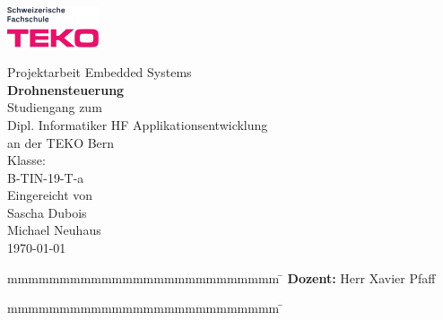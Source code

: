 \newcommand{\arbeit}{Projektarbeit Embedded Systems}
\newcommand{\autorS}{Sascha Dubois}
\newcommand{\autorM }{Michael Neuhaus}
\newcommand{\gutachter}{Herr Xavier Pfaff}
\newcommand{\thema}{Drohnensteuerung}
\newcommand{\studiengang}{Dipl. Informatiker HF Applikationsentwicklung}
\newcommand{\studienjahrgang}{B-TIN-19-T-a}
\newcommand{\datumAbgabe}{\today}
\newcommand{\projektabschluss}{31. Oktober 2022 }

\begin{titlepage}
    \includegraphics[width=2.7cm]{content/images/teko.png}
	\enlargethispage{20mm}
	\begin{center}
		\vspace*{12mm}	{\large\normalfont \arbeit}\\
		\vspace*{12mm}	{\huge\bfseries \thema }\\
    \vspace*{12mm}  Studiengang zum \\
		\vspace*{3mm}	  \studiengang\\
    \vspace*{3mm}   an der TEKO Bern\\
    \vspace*{3mm}   Klasse:\\ 
    \vspace*{2mm}   \studienjahrgang\\
		\vspace*{12mm}	Eingereicht von\\
		\vspace*{3mm} 	{\large\normalfont \autorS}\\
    \vspace*{3mm} 	{\large\normalfont \autorM}\\
		\vspace*{12mm}	\datumAbgabe\\
	\end{center}
	\vspace{2cm}
	\begin{figure}[htp]
		\begin{center}
		\end{center}
	\end{figure}
	\vfill
	\begin{spacing}{1.2}
		\begin{tabbing}
			mmmmmmmmmmmmmmmmmmmmmmmmmm      \= \kill
			\textbf{Dozent:}                 \>  \gutachter
		\end{tabbing}
    \begin{tabbing}
      mmmmmmmmmmmmmmmmmmmmmmmmmm      \= \kill
    \end{tabbing}
		\end{spacing}
		\vspace*{20mm}
\end{titlepage}
